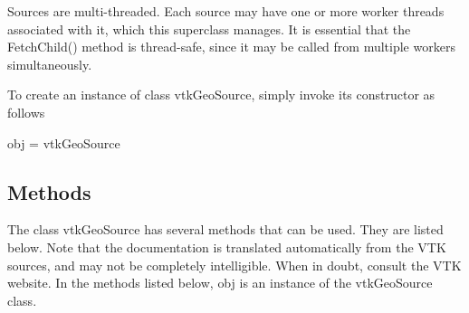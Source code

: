 Sources are multi-\/threaded. Each source may have one or more worker threads associated with it, which this superclass manages. It is essential that the Fetch\-Child() method is thread-\/safe, since it may be called from multiple workers simultaneously.

To create an instance of class vtk\-Geo\-Source, simply invoke its constructor as follows \begin{DoxyVerb}  obj = vtkGeoSource
\end{DoxyVerb}
 \hypertarget{vtkwidgets_vtkxyplotwidget_Methods}{}\subsection{Methods}\label{vtkwidgets_vtkxyplotwidget_Methods}
The class vtk\-Geo\-Source has several methods that can be used. They are listed below. Note that the documentation is translated automatically from the V\-T\-K sources, and may not be completely intelligible. When in doubt, consult the V\-T\-K website. In the methods listed below, {\ttfamily obj} is an instance of the vtk\-Geo\-Source class. 

